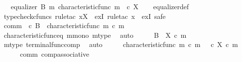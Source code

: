 \begin{isabellebody}
\ \ \ {\isachardoublequoteopen}equalizer\ B\ m\ {\isacharparenleft}{\kern0pt}characteristic{\isacharunderscore}{\kern0pt}func\ m{\isacharparenright}{\kern0pt}\ {\isacharparenleft}{\kern0pt}{\isasymt}\ {\isasymcirc}\isactrlsub c\ {\isasymbeta}\isactrlbsub X\isactrlesub {\isacharparenright}{\kern0pt}{\isachardoublequoteclose}\isanewline
%
\isadelimproof
\ \ %
\endisadelimproof
%
\isatagproof
{}\isamarkupfalse%
\ equalizer{\isacharunderscore}{\kern0pt}def\isanewline
{}\isamarkupfalse%
\ {\isacharparenleft}{\kern0pt}typecheck{\isacharunderscore}{\kern0pt}cfuncs{\isacharcomma}{\kern0pt}\ rule{\isacharunderscore}{\kern0pt}tac\ x{\isacharequal}{\kern0pt}{\isachardoublequoteopen}X{\isachardoublequoteclose}\ \ exI{\isacharcomma}{\kern0pt}\ rule{\isacharunderscore}{\kern0pt}tac\ x{\isacharequal}{\kern0pt}{\isachardoublequoteopen}{\isasymOmega}{\isachardoublequoteclose}\ \ exI{\isacharcomma}{\kern0pt}\ safe{\isacharparenright}{\kern0pt}\isanewline
\ \ \isamarkupfalse%
\ comm{\isacharcolon}{\kern0pt}\ {\isachardoublequoteopen}{\isasymt}\ {\isasymcirc}\isactrlsub c\ {\isasymbeta}\isactrlbsub B\isactrlesub \ {\isacharequal}{\kern0pt}\ characteristic{\isacharunderscore}{\kern0pt}func\ m\ {\isasymcirc}\isactrlsub c\ m{\isachardoublequoteclose}\isanewline
\ \ \ \ \isamarkupfalse%
\ characteristic{\isacharunderscore}{\kern0pt}func{\isacharunderscore}{\kern0pt}eq\ m{\isacharunderscore}{\kern0pt}mono\ m{\isacharunderscore}{\kern0pt}type\ \isamarkupfalse%
\ auto\isanewline
\ \ \isamarkupfalse%
\ \isamarkupfalse%
\ {\isachardoublequoteopen}{\isasymbeta}\isactrlbsub B\isactrlesub \ {\isacharequal}{\kern0pt}\ {\isasymbeta}\isactrlbsub X\isactrlesub \ {\isasymcirc}\isactrlsub c\ m{\isachardoublequoteclose}\isanewline
\ \ \ \ \isamarkupfalse%
\ m{\isacharunderscore}{\kern0pt}type\ terminal{\isacharunderscore}{\kern0pt}func{\isacharunderscore}{\kern0pt}comp\ \isamarkupfalse%
\ auto\isanewline
\ \ \isamarkupfalse%
\ \isamarkupfalse%
\ {\isachardoublequoteopen}characteristic{\isacharunderscore}{\kern0pt}func\ m\ {\isasymcirc}\isactrlsub c\ m\ {\isacharequal}{\kern0pt}\ {\isacharparenleft}{\kern0pt}{\isasymt}\ {\isasymcirc}\isactrlsub c\ {\isasymbeta}\isactrlbsub X\isactrlesub {\isacharparenright}{\kern0pt}\ {\isasymcirc}\isactrlsub c\ m{\isachardoublequoteclose}\isanewline
\ \ \ \ \isamarkupfalse%
\ comm\ comp{\isacharunderscore}{\kern0pt}associative{}\ \isamarkupfalse%

\end{isabellebody}
